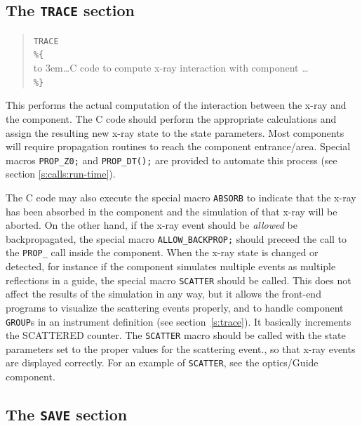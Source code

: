 \subsection{The \texttt{TRACE} section}
\label{s:comp-trace}

\begin{quote}
  \texttt{TRACE} \\
  \verb|%{| \\
  \hbox to 3em{}\ldots C code to compute x-ray interaction with
    component \ldots \\
  \verb|%}|
\end{quote}
This performs the actual computation of the interaction between the
x-ray and the component. The C code should perform the appropriate
calculations and assign the resulting new x-ray state to the state
parameters. Most components will require propagation routines to reach the component entrance/area. Special macros \verb+PROP_Z0;+ and \verb+PROP_DT();+ are provided to automate this process (see section \ref{s:calls:run-time}).

The C code may also execute the special macro \texttt{ABSORB} to indicate
that the x-ray has been absorbed in the component and the simulation of
that x-ray will be aborted. On the other hand, if the x-ray event
should be \emph{allowed} be backpropagated, the special macro
\verb+ALLOW_BACKPROP;+ should preceed the call to the \verb+PROP_+
call inside the component.
When the x-ray state is changed or detected, for
instance if the component simulates multiple events as multiple
reflections in a guide, the
special macro \texttt{SCATTER} should be called. This does not affect the
results of the simulation in any way, but it allows the front-end
programs to visualize the scattering events properly, and to handle
component \texttt{GROUP}s in an instrument definition (see
section~\ref{s:trace}). It basically increments the SCATTERED counter. The \texttt{SCATTER} macro should be called with
the state parameters set to the proper values for the scattering event., so that x-ray events are displayed correctly.
For an example of \texttt{SCATTER}, see the optics/Guide
component. 


\subsection{The \texttt{SAVE} section}
\label{s:comp-save}

